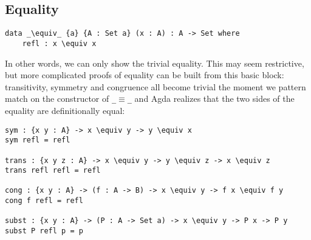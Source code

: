 \subsection{Equality}

\begin{lstlisting}[caption={Equality in Agda},label={lst:tutorial:equality},emph={refl}]
data _\equiv_ {a} {A : Set a} (x : A) : A -> Set where
    refl : x \equiv x
\end{lstlisting}

In other words, we can only show the trivial equality. This may seem restrictive, but more complicated proofs of equality can be built from this basic block: transitivity, symmetry and congruence all become trivial the moment we pattern match on the constructor of \texttt{\_$\equiv$\_} and Agda realizes that the two sides of the equality are definitionally equal:

\begin{lstlisting}[caption={Reasoning in Agda},label={lst:tutorial:reasoning
},emph={sym,cong,trans,subst}]
sym : {x y : A} -> x \equiv y -> y \equiv x
sym refl = refl

trans : {x y z : A} -> x \equiv y -> y \equiv z -> x \equiv z
trans refl refl = refl

cong : {x y : A} -> (f : A -> B) -> x \equiv y -> f x \equiv f y
cong f refl = refl

subst : {x y : A} -> (P : A -> Set a) -> x \equiv y -> P x -> P y
subst P refl p = p
\end{lstlisting}

